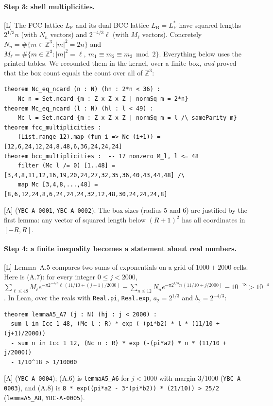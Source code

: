 \documentclass[11pt]{article}
\newcommand{\tier}[1]{\textsf{[#1]}}
\newcommand{\tA}{\tier{A}}
\newcommand{\tL}{\tier{L}}
\newcommand{\lean}[1]{\texttt{#1}}
\newcommand{\LF}{L_{\mathrm F}}
\newcommand{\LB}{L_{\mathrm B}}
\begin{document}
\paragraph{Step 3: shell multiplicities.}\tL{} The FCC lattice $\LF$ and its dual BCC lattice $\LB=\LF^*$ have squared lengths $2^{1/3}n$ (with $N_n$ vectors) and
$2^{-4/3}\ell$ (with $M_\ell$ vectors). Concretely $N_n=\#\{m\in\mathbb Z^3:|m|^2=2n\}$ and $M_\ell=\#\{m\in\mathbb Z^3:|m|^2=\ell,\ m_1\equiv m_2\equiv m_3 \bmod 2\}$.
Everything below uses the printed tables. We recounted them in the kernel, over a finite box, \emph{and} proved that the box count equals the count over all of $\mathbb Z^3$:
\begin{lstlisting}
theorem Nc_eq_ncard (n : N) (hn : 2*n < 36) :
    Nc n = Set.ncard {m : Z x Z x Z | normSq m = 2*n}
theorem Mc_eq_ncard (l : N) (hl : l < 49) :
    Mc l = Set.ncard {m : Z x Z x Z | normSq m = l /\ sameParity m}
theorem fcc_multiplicities :
    (List.range 12).map (fun i => Nc (i+1)) = [12,6,24,12,24,8,48,6,36,24,24,24]
theorem bcc_multiplicities :  -- 17 nonzero M_l, l <= 48
    filter (Mc l /= 0) [1..48] = [3,4,8,11,12,16,19,20,24,27,32,35,36,40,43,44,48] /\
    map Mc [3,4,8,...,48] = [8,6,12,24,8,6,24,24,24,32,12,48,30,24,24,24,8]
\end{lstlisting}
\tA{} (\texttt{YBC-A-0001}, \texttt{YBC-A-0002}). The box sizes (radius 5 and 6) are justified by the first lemma: any vector of squared length below $(R+1)^2$ has all coordinates in $[-R,R]$.

\paragraph{Step 4: a finite inequality becomes a statement about real numbers.}\tL{} Lemma~A.5 compares two sums of exponentials on a grid of $1000+2000$ cells. Here is (A.7):
for every integer $0\le j<2000$, $\sum_{\ell\le48}M_\ell e^{-\pi 2^{-4/3}\ell\,(11/10+(j+1)/2000)}-\sum_{n\le12}N_n e^{-\pi2^{1/3}n\,(11/10+j/2000)}-10^{-18}>10^{-4}$.
In Lean, over the reals with \lean{Real.pi}, \lean{Real.exp}, $a_2=2^{1/3}$ and $b_2=2^{-4/3}$:
\begin{lstlisting}
theorem lemmaA5_A7 (j : N) (hj : j < 2000) :
  sum l in Icc 1 48, (Mc l : R) * exp (-(pi*b2) * l * (11/10 + (j+1)/2000))
  - sum n in Icc 1 12, (Nc n : R) * exp (-(pi*a2) * n * (11/10 + j/2000))
  - 1/10^18 > 1/10000
\end{lstlisting}
\tA{} (\texttt{YBC-A-0004}); (A.6) is \lean{lemmaA5\_A6} for $j<1000$ with margin $3/1000$ (\texttt{YBC-A-0003}), and (A.8) is
\lean{8 * exp((pi*a2 - 3*(pi*b2)) * (21/10)) > 25/2} (\lean{lemmaA5\_A8}, \texttt{YBC-A-0005}).
\end{document}
